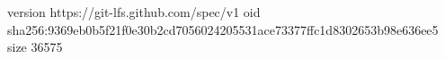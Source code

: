 version https://git-lfs.github.com/spec/v1
oid sha256:9369eb0b5f21f0e30b2cd7056024205531ace73377ffc1d8302653b98e636ee5
size 36575
